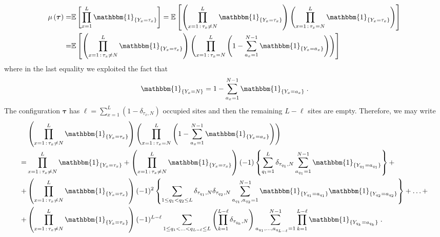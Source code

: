 \documentclass[10pt]{article}
\numberwithin{equation}{section}
\numberwithin{equation}{subsection}
\newcommand{\dt}{\;.}
\begin{document}
\begin{align}
	\mu\left(\bm{\tau}\right)=&\mathbb{E}\left[\prod_{x=1}^{L}\mathbbm{1}_{\{Y_{x}=\tau_{x}\}}\right]
	=\mathbb{E}\left[\left(\prod_{x=1\,:\,\tau_{x}\neq N}^{L}\mathbbm{1}_{\{Y_{x}=\tau_{x}\}}\right)\left(\prod_{x=1\,:\,\tau_{x}=N}^{L}\mathbbm{1}_{\{Y_{x}=\tau_x\}}\right)\right]\nonumber\\
	=&\mathbb{E}\left[\left(\prod_{x=1\,:\,\tau_{x}\neq N}^{L}\mathbbm{1}_{\{Y_{x}=\tau_{x}\}}\right)\left(\prod_{x=1\,:\,\tau_{x}=N}^{L}\left(1-\sum_{a_{x}=1}^{N-1}\mathbbm{1}_{\{Y_{x}=a_{x}\}}\right)\right)\right]
\end{align}
where in the last equality we exploited the fact that 
\begin{equation}			\mathbbm{1}_{\{Y_{x}=N\}}=1-\sum_{a_{x}=1}^{N-1}\mathbbm{1}_{\{Y_{x}=a_{x}\}}\dt
\end{equation}
The configuration $\bm{\tau}$ has $\ell=\sum_{x=1}^{L}(1-\delta_{\tau_{x},N})$ occupied sites and then the remaining $L-\ell$ sites are empty. %
Therefore, we may write
\begin{align}
&\left(\prod_{x=1\,:\,\tau_{x}\neq N}^{L}\mathbbm{1}_{\{Y_x=\tau_{x}\}}\right)\left(\prod_{x=1\,:\,\tau_{x}=N}^{L}\left(1-\sum_{a_{x}=1}^{N-1}\mathbbm{1}_{\{Y_x=a_{x}\}}\right)\right)\nonumber\\
=&
\prod_{x=1\,:\,\tau_{x}\neq N}^{L}\mathbbm{1}_{\{Y_x=\tau_{x}\}}+\left(\prod_{x=1\,:\,\tau_{x}\neq N}^{L}\mathbbm{1}_{\{Y_x=\tau_{x}\}}\right)(-1)\left\{\sum_{q_{1}=1}^{L}\delta_{\tau_{q_{1}},N}\sum_{a_{q_{1}}=1}^{N-1}\mathbbm{1}_{\{Y_{q_{1}}=a_{q_{1}}\}}\right\}+\nonumber\\
+&\left(\prod_{x=1\,:\,\tau_{x}\neq N}^{L}\mathbbm{1}_{\{Y_x=\tau_{x}\}}\right)(-1)^{2}\left\{\sum_{1\leq q_{1}<q_{2}\leq L}\delta_{\tau_{q_{1}},N}\delta_{\tau_{q_{2}},N}\sum_{a_{q_{1}},a_{q_{2}}=1}^{N-1}\mathbbm{1}_{\{Y_{q_{1}}=a_{q_{1}}\}}\mathbbm{1}_{\{Y_{q_{2}}=a_{q_{2}}\}}\right\}+\ldots+\nonumber\\
+&\left(\prod_{x=1\,:\,\tau_{x}\neq N}^{L}\mathbbm{1}_{\{Y_x=\tau_{x}\}}\right)(-1)^{L-\ell}\sum_{1\leq q_{1}<\ldots<q_{L-\ell}\leq L}\left(\prod_{k=1}^{L-\ell}\delta_{\tau_{q_{k}},N}\right)\sum_{a_{q_{1}},\ldots,a_{q_{L-\ell}}=1}^{N-1}\prod_{k=1}^{L-\ell}\mathbbm{1}_{\{Y_{q_{k}}=a_{q_{k}}\}}\dt
\end{align} 
\end{document}
